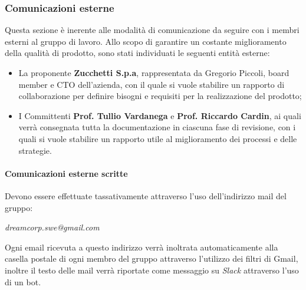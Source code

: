         \subsubsection{Comunicazioni esterne}
            Questa sezione è inerente alle modalità di comunicazione da seguire con i membri esterni al gruppo di lavoro.
            \newline
            Allo scopo di garantire un costante miglioramento della qualità di prodotto, sono stati individuati le seguenti entità esterne:
            \begin{itemize}
                \item La proponente \textbf{Zucchetti S.p.a}, rappresentata da Gregorio Piccoli, board member e CTO dell'azienda, con il quale si vuole stabilire un rapporto di collaborazione per definire bisogni e requisiti per la realizzazione del prodotto;
                \item I Committenti \textbf{Prof. Tullio Vardanega} e \textbf{Prof. Riccardo Cardin}, ai quali verrà consegnata tutta la documentazione in ciascuna fase di revisione, con i quali si vuole stabilire un rapporto utile al miglioramento dei processi e delle strategie.
            \end{itemize}
            \paragraph{Comunicazioni esterne scritte} Devono essere effettuate tassativamente attraverso l'uso dell'indirizzo mail del gruppo:
            \newline
            \begin{center}
            	\textit{dreamcorp.swe@gmail.com}
            \end{center}
            \newline
            Ogni email ricevuta a questo indirizzo verrà inoltrata automaticamente alla casella postale di ogni membro del gruppo attraverso l'utilizzo dei filtri di Gmail\pedice, inoltre il testo delle mail verrà riportate come messaggio su \textit{Slack} attraverso l'uso di un bot.
